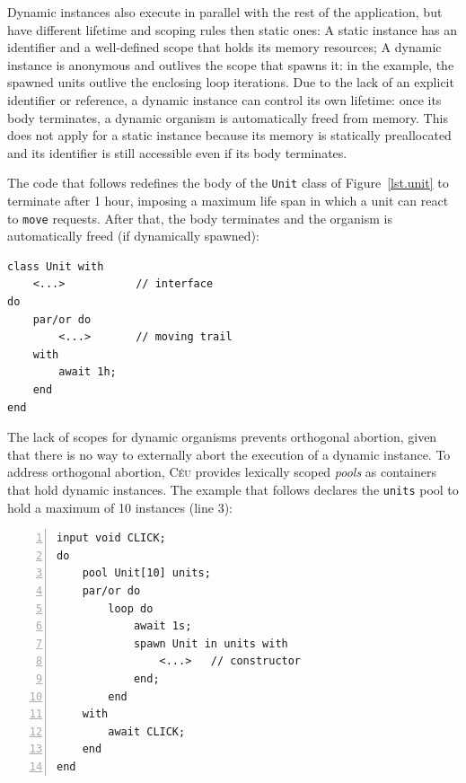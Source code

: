 \documentclass{sigplanconf}
\newcommand{\CEU}{\textsc{C\'{e}u}\xspace}
\newcommand{\code}[1] {{\small{\texttt{#1}}}}
\newcommand{\1}{\;}
\newcommand{\2}{\;\;}
\newcommand{\3}{\;\;\;}
\newcommand{\5}{\;\;\;\;\;}
\begin{document}
Dynamic instances also execute in parallel with the rest of the application, 
but have different lifetime and scoping rules then static ones:
%
A static instance has an identifier and a well-defined scope that holds its 
memory resources;
A dynamic instance is anonymous and outlives the scope that spawns it:
in the example, the spawned units outlive the enclosing loop iterations.
%
Due to the lack of an explicit identifier or reference, a dynamic instance can 
control its own lifetime:
once its body terminates, a dynamic organism is automatically freed from 
memory.
%
This does not apply for a static instance because its memory is statically 
preallocated and its identifier is still accessible even if its body 
terminates.

The code that follows redefines the body of the \code{Unit} class of 
Figure~\ref{lst.unit} to terminate after 1 hour, imposing a maximum life span 
in which a unit can react to \code{move} requests.
After that, the body terminates and the organism is automatically freed (if 
dynamically spawned):

\begin{lstlisting}
class Unit with
    <...>           // interface
do
    par/or do
        <...>       // moving trail
    with
        await 1h;
    end
end
\end{lstlisting}

The lack of scopes for dynamic organisms prevents orthogonal abortion, given 
that there is no way to externally abort the execution of a dynamic instance.
%
To address orthogonal abortion, \CEU provides lexically scoped \emph{pools} as 
containers that hold dynamic instances.
%
The example that follows declares the \code{units} pool to hold a maximum of 10 
instances (line 3):


\begin{lstlisting}[numbers=left,xleftmargin=3em]
input void CLICK;
do
    pool Unit[10] units;
    par/or do
        loop do
            await 1s;
            spawn Unit in units with
                <...>   // constructor
            end;
        end
    with
        await CLICK;
    end
end
\end{lstlisting}
\end{document}
